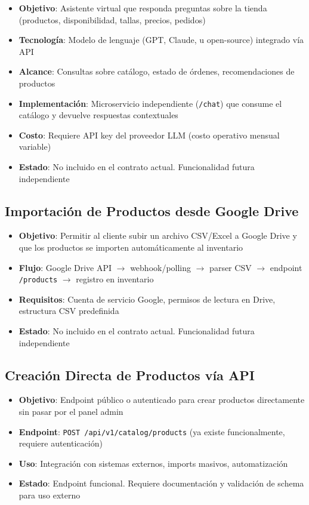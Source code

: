 \documentclass[11pt,a4paper]{article}
\begin{document}
\begin{itemize}
    \item \textbf{Objetivo}: Asistente virtual que responda preguntas sobre la tienda (productos, disponibilidad, tallas, precios, pedidos)
    \item \textbf{Tecnología}: Modelo de lenguaje (GPT, Claude, u open-source) integrado vía API
    \item \textbf{Alcance}: Consultas sobre catálogo, estado de órdenes, recomendaciones de productos
    \item \textbf{Implementación}: Microservicio independiente (\texttt{/chat}) que consume el catálogo y devuelve respuestas contextuales
    \item \textbf{Costo}: Requiere API key del proveedor LLM (costo operativo mensual variable)
    \item \textbf{Estado}: No incluido en el contrato actual. Funcionalidad futura independiente
\end{itemize}

\subsection{Importación de Productos desde Google Drive}

\begin{itemize}
    \item \textbf{Objetivo}: Permitir al cliente subir un archivo CSV/Excel a Google Drive y que los productos se importen automáticamente al inventario
    \item \textbf{Flujo}: Google Drive API $\rightarrow$ webhook/polling $\rightarrow$ parser CSV $\rightarrow$ endpoint \texttt{/products} $\rightarrow$ registro en inventario
    \item \textbf{Requisitos}: Cuenta de servicio Google, permisos de lectura en Drive, estructura CSV predefinida
    \item \textbf{Estado}: No incluido en el contrato actual. Funcionalidad futura independiente
\end{itemize}

\subsection{Creación Directa de Productos vía API}

\begin{itemize}
    \item \textbf{Objetivo}: Endpoint público o autenticado para crear productos directamente sin pasar por el panel admin
    \item \textbf{Endpoint}: \texttt{POST /api/v1/catalog/products} (ya existe funcionalmente, requiere autenticación)
    \item \textbf{Uso}: Integración con sistemas externos, imports masivos, automatización
    \item \textbf{Estado}: Endpoint funcional. Requiere documentación y validación de schema para uso externo
\end{itemize}
\end{document}
